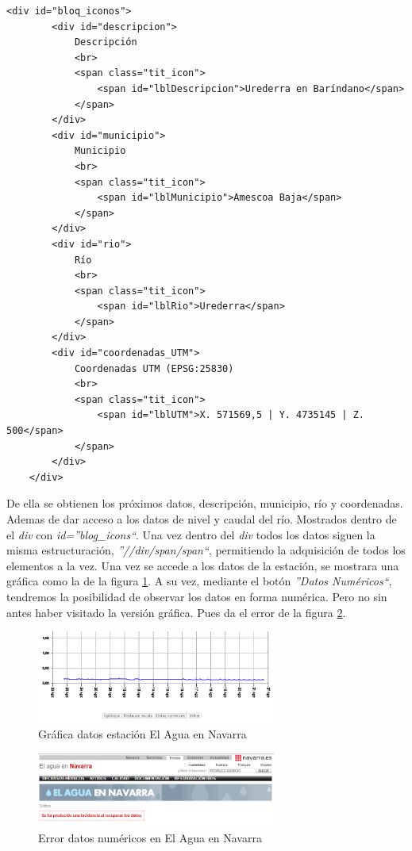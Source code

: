 \begin{lstlisting}[basicstyle=\footnotesize, caption={HTML estaciones en El Agua en Navarra}]
	<div id="bloq_iconos">
		<div id="descripcion">
			Descripción
			<br>
			<span class="tit_icon">
				<span id="lblDescripcion">Urederra en Baríndano</span>
			</span>
		</div>
		<div id="municipio">
			Municipio
			<br>
			<span class="tit_icon">
				<span id="lblMunicipio">Amescoa Baja</span>
			</span>
		</div>
		<div id="rio">
			Río
			<br>
			<span class="tit_icon">
				<span id="lblRio">Urederra</span>
			</span>
		</div>
		<div id="coordenadas_UTM">
			Coordenadas UTM (EPSG:25830)
			<br>
			<span class="tit_icon">
				<span id="lblUTM">X. 571569,5 | Y. 4735145 | Z. 500</span>
			</span>
		</div>
	</div>
\end{lstlisting}

De ella se obtienen los próximos datos, descripción, municipio, río y coordenadas. Ademas de dar acceso a los datos de nivel y caudal del río. Mostrados dentro de el \textit{div} con \textit{id=''blog\_icons``}. Una vez dentro del \textit{div} todos los datos siguen la misma estructuración, \textit{''//div/span/span``}, permitiendo la adquisición de todos los elementos a la vez.\newline
\newline
Una vez se accede a los datos de la estación, se mostrara una gráfica como la de la figura \ref{fig:ej25}. A su vez, mediante el botón \textit{''Datos Numéricos``}, tendremos la posibilidad de observar los datos en forma numérica. Pero no sin antes haber visitado la versión gráfica. Pues da el error de la figura \ref{fig:ej5}.

\begin{figure} [H]
	\centering
	\includegraphics[width=0.7\textwidth]{fig/AguaEnNavarraGrafica.png}
	\caption[Gráfica de datos en estación de El Agua en Navarra]{Gráfica datos estación El Agua en Navarra}
	\label{fig:ej25}
\end{figure}

\begin{figure} [H]
	\centering
	\includegraphics[width=0.7\textwidth]{fig/ErrorAguaEnNavarra.png}
	\caption[Error al cargar directamente la página de datos numéricos en El Agua en Navarra]{Error datos numéricos en El Agua en Navarra}
	\label{fig:ej5}
\end{figure}


